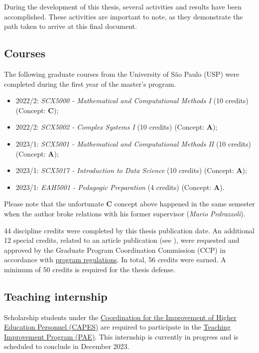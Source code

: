 \documentclass[
12pt,
openright,
oneside,
a4paper,
chapter=TITLE,
section=TITLE,
french,
spanish,
brazil,
english
]{abntex2}\usepackage{array}
\begin{document}
During the development of this thesis, several activities and results
have been accomplished. These activities are important to note, as they
demonstrate the path taken to arrive at this final document.

\subsection{Courses}\label{courses}

The following graduate courses from the University of São Paulo (USP)
were completed during the first year of the master's program.

\begin{itemize}
\tightlist
\item
  2022/2: \emph{SCX5000 - Mathematical and Computational Methods I} (10
  credits) (Concept: \textbf{C});
\item
  2022/2: \emph{SCX5002 - Complex Systems I} (10 credits) (Concept:
  \textbf{A});
\item
  2023/1: \emph{SCX5001 - Mathematical and Computational Methods II} (10
  credits) (Concept: \textbf{A});
\item
  2023/1: \emph{SCX5017 - Introduction to Data Science} (10 credits)
  (Concept: \textbf{A});
\item
  2023/1: \emph{EAH5001 - Pedagogic Preparation} (4 credits) (Concept:
  \textbf{A}).
\end{itemize}

Please note that the unfortunate \textbf{C} concept above happened in
the same semester when the author broke relations with his former
supervisor (\emph{Mario Pedrazzoli}).

44 discipline credits were completed by this thesis publication date. An
additional 12 special credits, related to an article publication (see
\textcite{viana-mendes2023}), were requested and approved by the
Graduate Program Coordination Commission (CCP) in accordance with
\href{https://leginf.usp.br/?resolucao=resolucao-copgr-no-7829-de-03-de-outubro-de-2019}{program
regulations}. In total, 56 credits were earned. A minimum of 50 credits
is required for the thesis defense.

\subsection{Teaching internship}\label{teaching-internship}

Scholarship students under the
\href{https://www.gov.br/capes/}{Coordination for the Improvement of
Higher Education Personnel (CAPES)} are required to participate in the
\href{www5.each.usp.br/pae/}{Teaching Improvement Program (PAE)}. This
internship is currently in progress and is scheduled to conclude in
December 2023.
\end{document}
